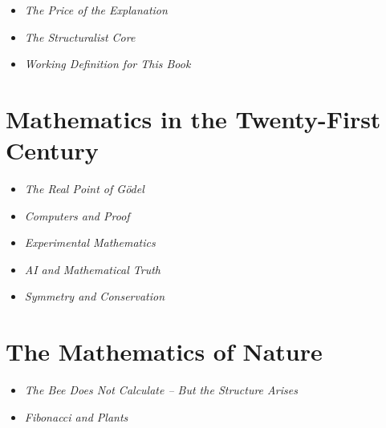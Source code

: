 \begin{NoteBox}
	
	\begin{itemize}
		\item \emph{The Price of the Explanation}\dotfill \pageref{box:kant-price}
		\item \emph{The Structuralist Core}\dotfill \pageref{box:structuralist-core}
		\item \emph{Working Definition for This Book}\dotfill \pageref{box:working-definition}
	\end{itemize}
\end{NoteBox}

\section{Mathematics in the Twenty-First Century}

\begin{DidacticBox}
	\begin{itemize}
		\item \emph{The Real Point of Gödel}\dotfill \pageref{box:godel-point}
		\item \emph{Computers and Proof}\dotfill \pageref{box:computer-proof}
		\item \emph{Experimental Mathematics}\dotfill \pageref{box:experimental-mathematics}
		\item \emph{AI and Mathematical Truth}\dotfill \pageref{box:ai-truth}
		\item \emph{Symmetry and Conservation}\dotfill \pageref{box:symmetry-conservation}
	\end{itemize}
\end{DidacticBox}

\section{The Mathematics of Nature}

\begin{NoteBox}
	
	\begin{itemize}
		\item \emph{The Bee Does Not Calculate -- But the Structure \newline Arises}\dotfill \pageref{box:bee-structure}
		\item \emph{Fibonacci and Plants}\dotfill \pageref{box:fibonacci-plants}
	\end{itemize}
\end{NoteBox}

